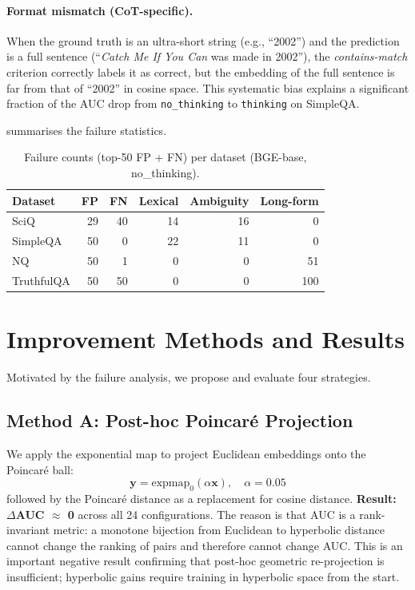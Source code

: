 \documentclass[11pt,a4paper]{article}
\begin{document}
\paragraph{Format mismatch (CoT-specific).}
When the ground truth is an ultra-short string (e.g., ``2002'') and the prediction
is a full sentence (``\emph{Catch Me If You Can} was made in 2002''), the
\emph{contains-match} criterion correctly labels it as correct, but the embedding
of the full sentence is far from that of ``2002'' in cosine space.
This systematic bias explains a significant fraction of the AUC drop from
\texttt{no\_thinking} to \texttt{thinking} on SimpleQA.

 summarises the failure statistics.

\begin{table}[ht]
\centering
\caption{Failure counts (top-50 FP + FN) per dataset (BGE-base, no\_thinking).}
\label{tab:failure}
\setlength{\tabcolsep}{5pt}
\begin{tabular}{lrrrrr}
\toprule
\textbf{Dataset} & \textbf{FP} & \textbf{FN}
  & \textbf{Lexical} & \textbf{Ambiguity} & \textbf{Long-form} \\
\midrule
SciQ       & 29 & 40 & 14 & 16 &  0 \\
SimpleQA   & 50 &  0 & 22 & 11 &  0 \\
NQ         & 50 &  1 &  0 &  0 & 51 \\
TruthfulQA & 50 & 50 &  0 &  0 & 100 \\
\bottomrule
\end{tabular}
\end{table}

\section{Improvement Methods and Results}
\label{sec:improvement}

Motivated by the failure analysis, we propose and evaluate four strategies.

\subsection{Method A: Post-hoc Poincaré Projection}

We apply the exponential map to project Euclidean embeddings onto the Poincaré ball:
\begin{equation}
  \mathbf{y} = \text{expmap}_0(\alpha \mathbf{x}), \quad \alpha = 0.05
\end{equation}
followed by the Poincaré distance as a replacement for cosine distance.
\textbf{Result: $\Delta$AUC $\approx$ 0} across all 24 configurations.
The reason is that AUC is a rank-invariant metric: a monotone bijection from
Euclidean to hyperbolic distance cannot change the ranking of pairs and therefore
cannot change AUC.
This is an important negative result confirming that post-hoc geometric
re-projection is insufficient; hyperbolic gains require training in hyperbolic space
from the start.
\end{document}
